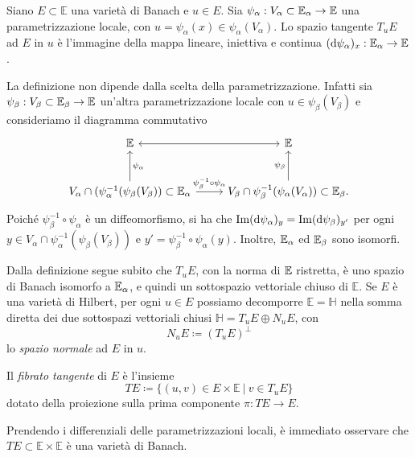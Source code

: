 \begin{defi}
	Siano \(E \subset \mathbb{E}\) una varietà di Banach e \(u \in E\). Sia \(\psi_\alpha: V_\alpha \subset \mathbb{E}_\alpha \to \mathbb{E}\) una parametrizzazione locale, con \(u=\psi_\alpha(x) \in \psi_\alpha(V_\alpha)\). Lo spazio tangente \(T_uE\) ad \(E\) in \(u\) è l'immagine della mappa lineare, iniettiva e continua \((\mathrm{d} \psi_\alpha)_x:\mathbb{E}_\alpha \to \mathbb{E}\).
\end{defi}
La definizione non dipende dalla scelta della parametrizzazione. Infatti sia \(\psi_\beta: V_\beta \subset \mathbb{E}_\beta \to \mathbb{E}\) un'altra parametrizzazione locale con \(u \in \psi_\beta(V_\beta)\) e consideriamo il diagramma commutativo
\[
\begin{tikzcd}[row sep=large]
	\mathbb{E}  \arrow[r,<->] & \mathbb{E} \\
	V_\alpha \cap(\psi_\alpha^{-1}(\psi_\beta(V_\beta)) \subset \E_\alpha \arrow[u, "\psi_\alpha"'] \arrow[r, "\psi_\beta^{-1} \circ \psi_\alpha"] & V_\beta \cap \psi_\beta^{-1}(\psi_\alpha(V_\alpha))\subset \E_\beta.   \arrow[u, "\psi_\beta"]
\end{tikzcd}
\]
Poiché \(\psi_\beta^{-1} \circ \psi_\alpha\) è un diffeomorfismo, si ha che \(\mathrm{Im}(\mathrm{d} \psi_\alpha)_y = \mathrm{Im} (\mathrm{d} \psi_\beta)_{y'}\) per ogni \(y \in V_\alpha \cap \psi_\alpha^{-1}(\psi_\beta(V_\beta))\) e \(y' = \psi_\beta^{-1} \circ \psi_\alpha(y)\). Inoltre, \(\mathbb{E}_\alpha\) ed \(\mathbb{E}_\beta\) sono isomorfi.

Dalla definizione segue subito che \(T_u E\), con la norma di \(\mathbb{E}\) ristretta, è uno spazio di Banach isomorfo a \(\mathbb{E}_\alpha\), e quindi un sottospazio vettoriale chiuso di \(\mathbb{E}\). Se \(E\) è una varietà di Hilbert, per ogni \(u \in E\) possiamo decomporre \(\mathbb{E}= \mathbb{H}\) nella somma diretta dei due sottospazi vettoriali chiusi \(\mathbb{H} = T_uE \oplus N_uE\), con 
\[
	N_uE \coloneq (T_uE)^\perp
\]
lo \textit{spazio normale} ad \(E\) in \(u\).

\begin{defi}
	Il \textit{fibrato tangente} di \(E\) è l'insieme 
	\[
		TE \coloneq \{(u,v) \in E \times \mathbb{E} \ | \ v \in T_uE\}
	\]
	dotato della proiezione sulla prima componente \(\pi:TE \to E\). 
\end{defi}

Prendendo i differenziali delle parametrizzazioni locali, è immediato osservare che \(TE \subset \mathbb{E} \times \mathbb{E}\) è una varietà di Banach. 

